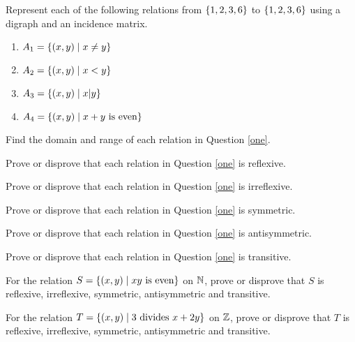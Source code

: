 \documentclass[12pt]{article}
\begin{document}
\begin{qu}\label{one}
Represent each of the following relations from $\left\{1,2,3,6\right\}$ to $\left\{1,2,3,6\right\}$ using a digraph and an incidence matrix.
\begin{enumerate}
\item $A_1=\left\{(x,y) \mid x \ne y\right\}$
\item $A_2=\left\{(x,y) \mid x < y\right\}$
\item $A_3=\left\{(x,y) \mid  x|y\right\}$
\item $A_4=\left\{(x,y) \mid x+y \textrm{ is even}\right\}$
\end{enumerate}
\end{qu}

\begin{qu}
Find the domain and range of each relation in Question \ref{one}. \end{qu}

\begin{qu}
Prove or disprove that each relation in Question \ref{one} is reflexive.
\end{qu}

\begin{qu}
Prove or disprove that each relation in Question \ref{one} is irreflexive.
\end{qu}

\begin{qu}
Prove or disprove that each relation in Question \ref{one} is symmetric.
\end{qu}

\begin{qu}
Prove or disprove that each relation in Question \ref{one} is antisymmetric.
\end{qu}

\begin{qu}
Prove or disprove that each relation in Question \ref{one} is transitive.
\end{qu}

\begin{qu}
For the relation $S=\left\{(x,y) \mid xy \textrm{ is even}\right\}$ on $\mathbb N$, prove or disprove that $S$ is reflexive, irreflexive, symmetric, antisymmetric and transitive.
\end{qu}

\begin{qu}
For the relation $T=\left\{(x,y) \mid 3 \textrm{ divides } x+2y\right\}$ on $\mathbb Z$, prove or disprove that $T$ is reflexive, irreflexive, symmetric, antisymmetric and transitive.
\end{qu}
\end{document}
